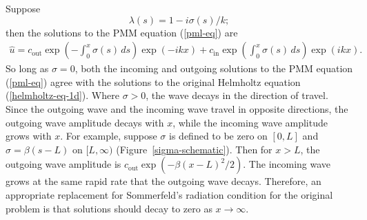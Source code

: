 \documentclass{article}
\newcommand{\note}[1]{\footnote{\textsc{To do}: #1}}
\begin{document}
Suppose
\begin{equation}
 \label{lambda-helmholtz-def}
 \lambda(s) = 1 - i \sigma(s) / k; 
\end{equation}
then the solutions to 
the PMM equation (\ref{pml-eq}) are
\begin{eqnarray}
  \hat{u} = 
    c_{\mathrm{out}} \exp\left(-\int_0^x \sigma(s) \, ds \right) 
                     \exp\left( -i k x \right) +
    c_{\mathrm{in}} \exp\left(\int_0^x \sigma(s) \, ds \right) 
                     \exp\left( i k x \right).
\end{eqnarray}
So long as $\sigma = 0$, both the incoming and outgoing solutions to
the PMM equation (\ref{pml-eq}) agree with the solutions to the
original Helmholtz equation (\ref{helmholtz-eq-1d}).  Where $\sigma >
0$, the wave decays in the direction of travel.  Since the outgoing
wave and the incoming wave travel in opposite directions, the outgoing
wave amplitude decays with $x$, while the incoming wave amplitude
grows with $x$.  For example, suppose $\sigma$ is defined to be zero
on $[0,L]$ and $\sigma = \beta (s-L)$ on $[L,\infty)$
(Figure~\ref{sigma-schematic}).  Then for $x > L$, the outgoing wave
amplitude is $c_\mathrm{out} \exp\left( -\beta(x-L)^2/2 \right).$ The
incoming wave grows at the same rapid rate that the outgoing wave
decays.  Therefore, an appropriate replacement for Sommerfeld's
radiation condition for the original problem is that solutions should
decay to zero as $x \rightarrow \infty$.
\end{document}
